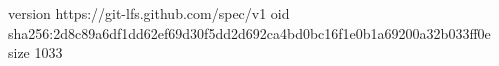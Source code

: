 version https://git-lfs.github.com/spec/v1
oid sha256:2d8c89a6df1dd62ef69d30f5dd2d692ca4bd0bc16f1e0b1a69200a32b033ff0e
size 1033
